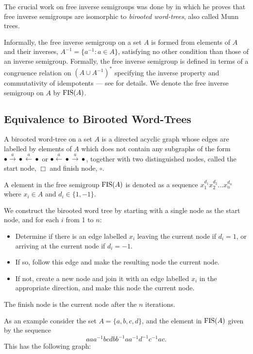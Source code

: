The crucial work on free inverse semigroups was done by \cite{Munn:74} in which he proves that free inverse semigroups are isomorphic to \emph{birooted word-trees}, also called Munn trees.

Informally, the free inverse semigroup on a set $A$ is formed from elements of $A$ and their inverses, $A^{-1} = \{a^{-1} : a \in A\}$, satisfying no other condition than those of an inverse semigroup. Formally, the free inverse semigroup is defined in terms of a congruence relation on $(A \cup A^{-1})^*$ specifying the inverse property and commutativity of idempotents --- see \cite{Munn:74} for details. We denote the free inverse semigroup on $A$ by $\operatorname{FIS}(A)$.


\subsection{Equivalence to Birooted Word-Trees}

A birooted word-tree on a set $A$ is a directed acyclic graph whose edges are labelled by elements of $A$ which does not contain any subgraphs of the form $\bullet \stackrel{a}{\longrightarrow} \bullet \stackrel{a}{\longleftarrow} \bullet$ or $\bullet \stackrel{a}{\longleftarrow} \bullet \stackrel{a}{\longrightarrow} \bullet$, together with two distinguished nodes, called the start node, $\Box$ and finish node, $\circ$.

A element in the free semigroup $\operatorname{FIS}(A)$ is denoted as a sequence $x_1^{d_1}x_2^{d_2}\ldots x_n^{d_n}$ where $x_i \in A$ and $d_i \in \{1,-1\}$.

 We construct the birooted word tree by starting with a single node as the start node, and for each $i$ from 1 to $n$:
\begin{itemize}
\item Determine if there is an edge labelled $x_i$ leaving the current node if $d_i = 1$, or arriving at the current node if $d_i = -1$.
\item If so, follow this edge and make the resulting node the current node.
\item If not, create a new node and join it with an edge labelled $x_i$ in the appropriate direction, and make this node the current node.
\end{itemize}
The finish node is the current node after the $n$ iterations.

As an example consider the set $A = \{a,b,c,d\}$, and the element in $\operatorname{FIS}(A)$ given by the sequence
$$aaa^{-1}bcdbb^{-1}aa^{-1}d^{-1}c^{-1}ac.$$
This has the following graph:

